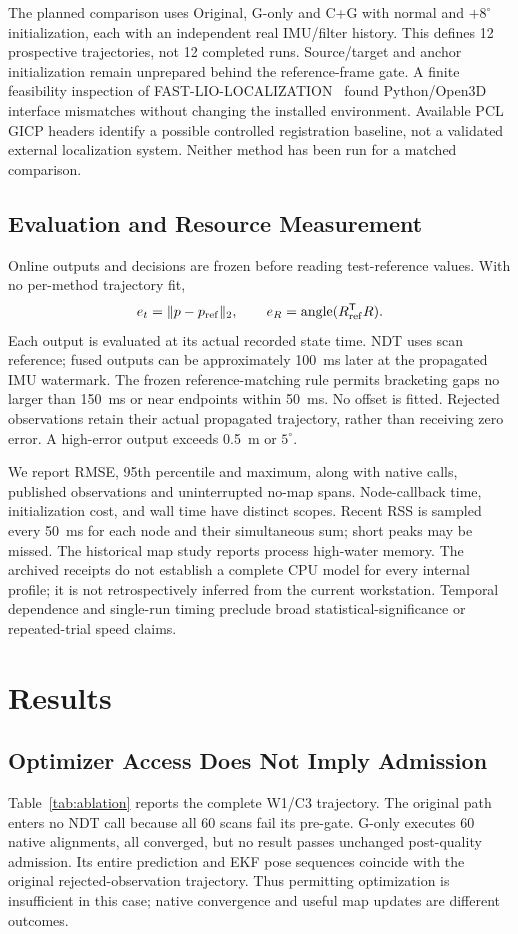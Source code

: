 \documentclass[journal,10pt,letterpaper]{IEEEtran}
\begin{document}
The planned comparison uses Original, G-only and C+G with normal and $+8^\circ$ initialization, each with an independent real IMU/filter history. This defines 12 prospective trajectories, not 12 completed runs. Source/target and anchor initialization remain unprepared behind the reference-frame gate. A finite feasibility inspection of FAST-LIO-LOCALIZATION~\cite{fastlioloc} found Python/Open3D interface mismatches without changing the installed environment. Available PCL GICP headers identify a possible controlled registration baseline, not a validated external localization system. Neither method has been run for a matched comparison.

\subsection{Evaluation and Resource Measurement}
Online outputs and decisions are frozen before reading test-reference values. With no per-method trajectory fit,
\begin{equation}
 e_t=\|p- p_{\rm ref}\|_2,\qquad
 e_R=\operatorname{angle}(R_{\rm ref}^{\mathsf T}R).
 \label{eq:errors}
\end{equation}
Each output is evaluated at its actual recorded state time. NDT uses scan reference; fused outputs can be approximately 100~ms later at the propagated IMU watermark. The frozen reference-matching rule permits bracketing gaps no larger than 150~ms or near endpoints within 50~ms. No offset is fitted. Rejected observations retain their actual propagated trajectory, rather than receiving zero error. A high-error output exceeds 0.5~m or $5^\circ$.

We report RMSE, 95th percentile and maximum, along with native calls, published observations and uninterrupted no-map spans. Node-callback time, initialization cost, and wall time have distinct scopes. Recent RSS is sampled every 50~ms for each node and their simultaneous sum; short peaks may be missed. The historical map study reports process high-water memory. The archived receipts do not establish a complete CPU model for every internal profile; it is not retrospectively inferred from the current workstation. Temporal dependence and single-run timing preclude broad statistical-significance or repeated-trial speed claims.

\section{Results}
\subsection{Optimizer Access Does Not Imply Admission}
Table~\ref{tab:ablation} reports the complete W1/C3 trajectory. The original path enters no NDT call because all 60 scans fail its pre-gate. G-only executes 60 native alignments, all converged, but no result passes unchanged post-quality admission. Its entire prediction and EKF pose sequences coincide with the original rejected-observation trajectory. Thus permitting optimization is insufficient in this case; native convergence and useful map updates are different outcomes.
\end{document}
